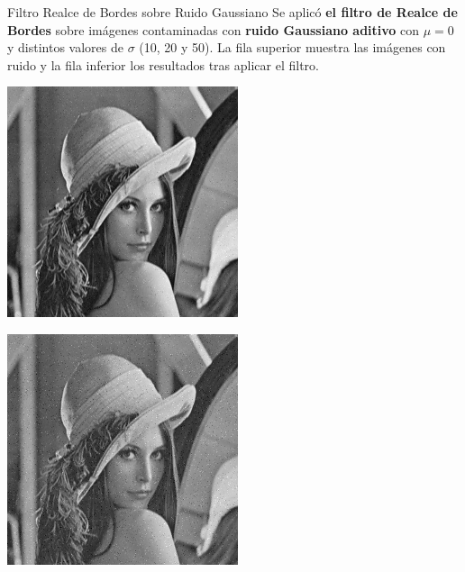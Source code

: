 \documentclass{beamer}
\begin{document}
\begin{frame}[fragile]{Filtro Realce de Bordes sobre Ruido Gaussiano}
	\justifying
	\footnotesize
	Se aplicó \textcolor{unahurverde}{\textbf{el filtro de Realce de Bordes}} sobre imágenes contaminadas con \textcolor{unahurverde}{\textbf{ruido Gaussiano aditivo}}  
	con $\mu = 0$ y distintos valores de $\sigma$ (10, 20 y 50).  
	La fila superior muestra las imágenes con ruido y la fila inferior los resultados tras aplicar el filtro.
	
	\centering
	\begin{minipage}{0.25\linewidth}
		\centering
		\includegraphics[width=\linewidth]{../results/lena_gauss_sigma10}
	\end{minipage}\hfill
	\begin{minipage}{0.25\linewidth}
		\centering
		\includegraphics[width=\linewidth]{../results/lena_gauss_sigma20}

\end{minipage}
\end{frame}
\end{document}
